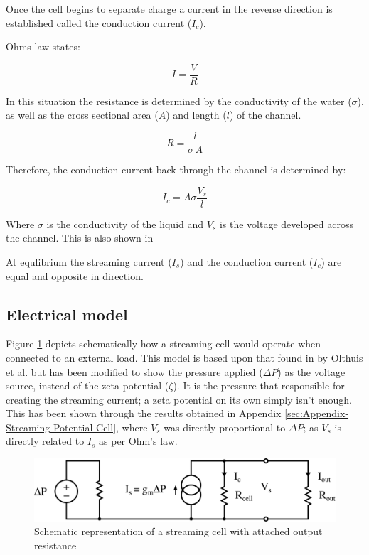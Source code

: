 Once the cell begins to separate charge a current in the reverse direction
is established called the conduction current ($I_{c}$).

Ohms law states:

\[
I=\frac{V}{R}
\]


In this situation the resistance is determined by the conductivity
of the water ($\sigma$), as well as the cross sectional area ($A$)
and length ($l$) of the channel.

\[
R=\frac{l}{\sigma\, A}
\]


Therefore, the conduction current back through the channel is determined
by:

\begin{equation}
I_{c}=A\sigma\frac{V_{s}}{l}
\end{equation}


Where $\sigma$ is the conductivity of the liquid and $V_{s}$ is
the voltage developed across the channel. This is also shown in

At equlibrium the streaming current ($I_{s}$) and the conduction
current ($I_{c}$) are equal and opposite in direction.


\subsection{\label{sub:Electrical-model}Electrical model}

Figure \ref{fig:StreamingCell_Schematic-representation} depicts schematically
how a streaming cell would operate when connected to an external load.
This model is based upon that found in \cite{Olthuis2005} by Olthuis
et al. but has been modified to show the pressure applied ($\Delta P$)
as the voltage source, instead of the zeta potential ($\zeta$). It
is the pressure that responsible for creating the streaming current;
a zeta potential on its own simply isn't enough. This has been shown
through the results obtained in Appendix \ref{sec:Appendix-Streaming-Potential-Cell},
where $V_{s}$ was directly proportional to $\Delta P$; as $V_{s}$
is directly related to $I_{s}$ as per Ohm's law.

\begin{figure}
\begin{centering}
\includegraphics[scale=0.55]{content/pt1/01-PowerHarvesting/StreamingCell_EquivalentCircuit_output}
\par\end{centering}

\protect\caption{\label{fig:StreamingCell_Schematic-representation}Schematic representation
of a streaming cell with attached output resistance}
\end{figure}



